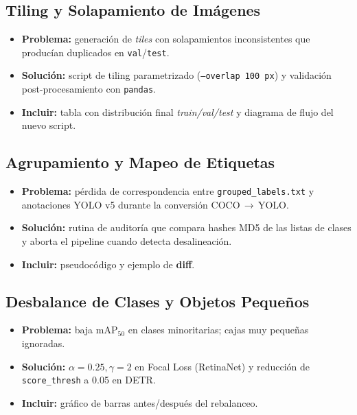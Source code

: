 \subsection{Tiling y Solapamiento de Imágenes}
\begin{itemize}
   \item \textbf{Problema:} generación de \emph{tiles} con solapamientos
         inconsistentes que producían duplicados en \texttt{val}/\texttt{test}.
   \item \textbf{Solución:} script de tiling parametrizado
         (\texttt{--overlap 100\,px}) y validación post-procesamiento
         con \texttt{pandas}.
   \item \textbf{Incluir:} tabla con distribución final
         \textit{train/val/test} y diagrama de flujo del nuevo script.
\end{itemize}

\subsection{Agrupamiento y Mapeo de Etiquetas}
\begin{itemize}
   \item \textbf{Problema:} pérdida de correspondencia entre
         \texttt{grouped\_labels.txt} y anotaciones YOLO v5
         durante la conversión COCO\,\(\rightarrow\)\,YOLO.
   \item \textbf{Solución:} rutina de auditoría que compara
         hashes MD5 de las listas de clases y
         aborta el pipeline cuando detecta desalineación.
   \item \textbf{Incluir:} pseudocódigo y ejemplo de \textbf{diff}.
\end{itemize}

\subsection{Desbalance de Clases y Objetos Pequeños}
\begin{itemize}
   \item \textbf{Problema:} baja \(\text{mAP}_{50}\)
         en clases minoritarias; cajas muy pequeñas ignoradas.
   \item \textbf{Solución:} \(\alpha=0.25,\gamma=2\) en Focal Loss
         (RetinaNet) y reducción de \texttt{score\_thresh}
         a 0.05 en DETR.
   \item \textbf{Incluir:} gráfico de barras antes/después del rebalanceo.
\end{itemize}

